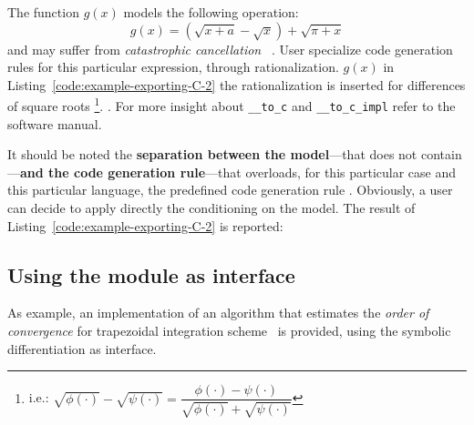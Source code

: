 The function $g(x)$ models the following operation:
\begin{equation}
g(x) = (\sqrt{x + a} - \sqrt{x}) + \sqrt{\pi + x}
\end{equation}
and may suffer from \emph{catastrophic  cancellation}~\cite{higham2002accuracy} . User  specialize code generation rules for this particular expression,  through rationalization.  $g(x)$ in Listing~\ref{code:example-exporting-C-2} the rationalization is inserted  for differences of square roots
\footnote{i.e.:
$\sqrt{\phi(\cdot)} - \sqrt{\psi(\cdot)} =
\dfrac{\phi(\cdot) - \psi(\cdot)}{\sqrt{\phi(\cdot)} + \sqrt{\psi(\cdot)}}$}.
. For more insight about \verb!__to_c! and \verb!__to_c_impl!\review{,} refer to the software manual.

\noindent%


It should be noted the \textbf{separation between the model}---that does not contain ---\textbf{and the code generation rule}---that overloads, for this particular case and this particular language, the predefined code generation rule . Obviously, a user can decide to apply directly the conditioning on the model. The result of Listing~\ref{code:example-exporting-C-2} is reported:

\noindent%
\begin{minipage}{.5\textwidth}

\end{minipage}\hfill
\begin{minipage}{.5\textwidth}

\end{minipage}

\subsection{Using the module as interface}
As example, an implementation of an algorithm that estimates the \emph{order of convergence} for trapezoidal integration scheme~\cite{weideman2002numerical} is provided, using the symbolic differentiation as interface.

